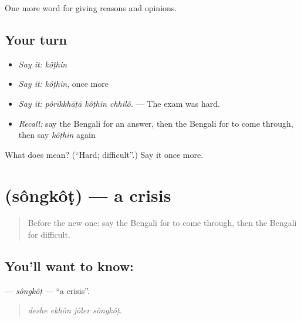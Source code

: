 \begin{grammarlens}[title={What you've built}]
One more word for giving reasons and opinions.
\end{grammarlens}

\subsection*{Your turn}
\begin{itemize}
\raggedright
  \item \emph{Say it:} \emph{kôṭhin}
  \item \emph{Say it:} \emph{kôṭhin}, once more
  \item \emph{Say it:} \emph{pôrīkkhāṭā kôṭhin chhilô.} — The exam was hard.
  \item \emph{Recall:} say the Bengali for an answer, then the Bengali for to come through, then say \emph{kôṭhin} again
\end{itemize}

\begin{tcolorbox}[breakable,colback=teal!4,colframe=teal!35!black,title={Before you move on}]
What does  mean? (\textquotedblleft{}Hard; difficult\textquotedblright{}.) Say it once more.
\end{tcolorbox}
\section[\texorpdfstring{\bn{সংকট} (sôngkôṭ)}{সংকট (sôngkôṭ)}]{ (sôngkôṭ) — a crisis}

\label{lesson:BN-C364-songkot}



\begin{quote}
Before the new one: say the Bengali for to come through, then the Bengali for difficult.
\end{quote}

\subsection*{You'll want to know: }
\textbf{} — \emph{sôngkôṭ} — \textquotedblleft{}a crisis\textquotedblright{}.

\begin{quote}
   
\end{quote}

\begin{quote}
\emph{deshe ekhôn jôler sôngkôṭ.}
\end{quote}

